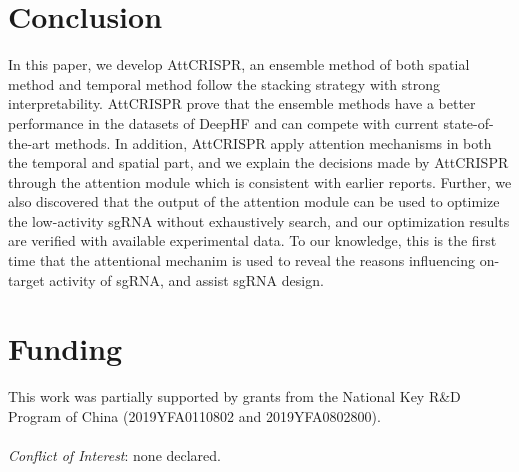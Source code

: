 \documentclass{bioinfo}
\begin{document}
\section{Conclusion}

In this paper, we develop AttCRISPR, an ensemble method of both spatial method and temporal method follow the stacking strategy with strong interpretability. 
AttCRISPR prove that the ensemble methods have a better performance in the datasets of DeepHF
and can compete with current state-of-the-art methods. 
In addition, AttCRISPR apply attention mechanisms in both the temporal and spatial part, 
and we explain the decisions made by AttCRISPR through the attention module which is consistent with earlier reports. 
Further, we also discovered that the output of the attention module can be used to optimize the low-activity sgRNA without exhaustively search, 
and our optimization results are verified with available experimental data. 
To our knowledge, this is the first time that the attentional mechanim is used to reveal the reasons influencing on-target activity of sgRNA, and assist sgRNA design.\vspace*{-20pt}

\section*{Funding}

This work was partially supported by grants from the National Key R\&D Program of China (2019YFA0110802 and 2019YFA0802800).
\\\\\emph{Conflict of Interest}: none declared.\vspace*{-12pt}



\end{document}
